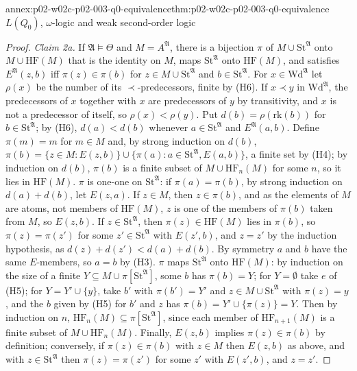 \begin{annexitem}{annex:p02-w02c-p02-003-q0-equivalence}{thm:p02-w02c-p02-003-q0-equivalence}{\(L(Q_0)\), \(\omega\)-logic and weak second-order logic}
\begin{proof}
\emph{Claim 2a.}  If \(\mathfrak A\models\Theta\) and \(M=A^{\mathfrak A}\),
there is a bijection \(\pi\) of \(M\cup\mathrm{St}^{\mathfrak A}\) onto
\(M\cup\mathrm{HF}(M)\) that is the identity on \(M\), maps
\(\mathrm{St}^{\mathfrak A}\) onto \(\mathrm{HF}(M)\), and satisfies
\(E^{\mathfrak A}(z,b)\) iff \(\pi(z)\in\pi(b)\) for \(z\in M\cup
\mathrm{St}^{\mathfrak A}\) and \(b\in\mathrm{St}^{\mathfrak A}\).  For
\(x\in\mathrm{Wd}^{\mathfrak A}\) let \(\rho(x)\) be the number of its
\(\prec\)-predecessors, finite by (H6).  If \(x\prec y\) in
\(\mathrm{Wd}^{\mathfrak A}\), the predecessors of \(x\) together with \(x\)
are predecessors of \(y\) by transitivity, and \(x\) is not a predecessor of
itself, so \(\rho(x)<\rho(y)\).  Put \(d(b)=\rho(\mathrm{rk}(b))\) for
\(b\in\mathrm{St}^{\mathfrak A}\); by (H6), \(d(a)<d(b)\) whenever
\(a\in\mathrm{St}^{\mathfrak A}\) and \(E^{\mathfrak A}(a,b)\).  Define
\(\pi(m)=m\) for \(m\in M\) and, by strong induction on \(d(b)\),
\(\pi(b)=\{z\in M:E(z,b)\}\cup\{\pi(a):a\in\mathrm{St}^{\mathfrak A},
E(a,b)\}\), a finite set by (H4); by induction on \(d(b)\), \(\pi(b)\) is a
finite subset of \(M\cup\mathrm{HF}_n(M)\) for some \(n\), so it lies in
\(\mathrm{HF}(M)\).  \(\pi\) is one-one on \(\mathrm{St}^{\mathfrak A}\): if
\(\pi(a)=\pi(b)\), by strong induction on \(d(a)+d(b)\), let \(E(z,a)\).
If \(z\in M\), then \(z\in\pi(b)\), and as the elements of \(M\) are atoms,
not members of \(\mathrm{HF}(M)\), \(z\) is one of the members of \(\pi(b)\)
taken from \(M\), so \(E(z,b)\).  If \(z\in\mathrm{St}^{\mathfrak A}\), then
\(\pi(z)\in\mathrm{HF}(M)\) lies in \(\pi(b)\), so \(\pi(z)=\pi(z')\) for
some \(z'\in\mathrm{St}^{\mathfrak A}\) with \(E(z',b)\), and \(z=z'\) by the
induction hypothesis, as \(d(z)+d(z')<d(a)+d(b)\).  By symmetry \(a\) and
\(b\) have the same \(E\)-members, so \(a=b\) by (H3).  \(\pi\) maps
\(\mathrm{St}^{\mathfrak A}\) onto \(\mathrm{HF}(M)\): by induction on the
size of a finite \(Y\subseteq M\cup\pi[\mathrm{St}^{\mathfrak A}]\), some
\(b\) has \(\pi(b)=Y\); for \(Y=\emptyset\) take \(e\) of (H5); for
\(Y=Y'\cup\{y\}\), take \(b'\) with \(\pi(b')=Y'\) and \(z\in M\cup
\mathrm{St}^{\mathfrak A}\) with \(\pi(z)=y\), and the \(b\) given by (H5)
for \(b'\) and \(z\) has \(\pi(b)=Y'\cup\{\pi(z)\}=Y\).  Then by induction
on \(n\), \(\mathrm{HF}_n(M)\subseteq\pi[\mathrm{St}^{\mathfrak A}]\), since
each member of \(\mathrm{HF}_{n+1}(M)\) is a finite subset of
\(M\cup\mathrm{HF}_n(M)\).  Finally, \(E(z,b)\) implies \(\pi(z)\in\pi(b)\)
by definition; conversely, if \(\pi(z)\in\pi(b)\) with \(z\in M\) then
\(E(z,b)\) as above, and with \(z\in\mathrm{St}^{\mathfrak A}\) then
\(\pi(z)=\pi(z')\) for some \(z'\) with \(E(z',b)\), and \(z=z'\).


\end{proof}
\end{annexitem}
